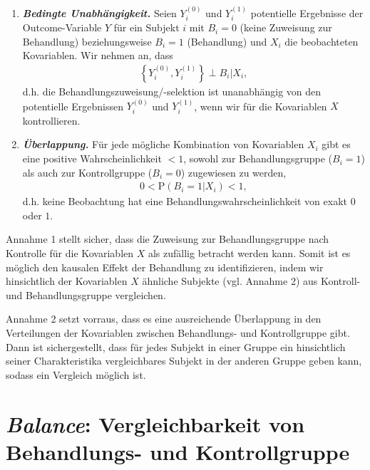 \documentclass[
  a4paper,
  DIV=11,
  oneside]{scrreprt}
\begin{document}
\begin{enumerate}
\def\labelenumi{\arabic{enumi}.}
\item
  \textbf{\emph{Bedingte Unabhängigkeit.}} Seien \(Y^{(0)}_i\) und
  \(Y^{(1)}_i\) potentielle Ergebnisse der Outcome-Variable \(Y\) für
  ein Subjekt \(i\) mit \(B_i=0\) (keine Zuweisung zur Behandlung)
  beziehungsweise \(B_i=1\) (Behandlung) und \(X_i\) die beobachteten
  Kovariablen. Wir nehmen an, dass \begin{align}
    \left\{Y^{(0)}_i, Y^{(1)}_i\right\} \perp B_i\vert X_i, \label{eq:cia}
  \end{align} d.h. die Behandlungszuweisung/-selektion ist unanabhängig
  von den potentielle Ergebnissen \(Y^{(0)}_i\) und \(Y^{(1)}_i\), wenn
  wir für die Kovariablen \(X\) kontrollieren.
\item
  \textbf{\emph{Überlappung.}} Für jede mögliche Kombination von
  Kovariablen \(X_i\) gibt es eine positive Wahrscheinlichkeit \(<1\),
  sowohl zur Behandlungsgruppe (\(B_i = 1\)) als auch zur Kontrollgruppe
  (\(B_i = 0\)) zugewiesen zu werden, \begin{align}
    0 < \text{P}(B_i=1\lvert X_i) < 1, \label{eq:overlap}
  \end{align} d.h. keine Beobachtung hat eine
  Behandlungswahrscheinlichkeit von exakt \(0\) oder \(1\).
\end{enumerate}

Annahme 1 stellt sicher, dass die Zuweisung zur Behandlungsgruppe nach
Kontrolle für die Kovariablen \(X\) als zufällig betracht werden kann.
Somit ist es möglich den kausalen Effekt der Behandlung zu
identifizieren, indem wir hinsichtlich der Kovariablen \(X\) ähnliche
Subjekte (vgl. Annahme 2) aus Kontroll- und Behandlungsgruppe
vergleichen.

Annahme 2 setzt vorraus, dass es eine ausreichende Überlappung in den
Verteilungen der Kovariablen zwischen Behandlungs- und Kontrollgruppe
gibt. Dann ist sichergestellt, dass für jedes Subjekt in einer Gruppe
ein hinsichtlich seiner Charakteristika vergleichbares Subjekt in der
anderen Gruppe geben kann, sodass ein Vergleich möglich ist.

\hypertarget{sec-balance}{%
\section{\texorpdfstring{\emph{Balance}: Vergleichbarkeit von
Behandlungs- und
Kontrollgruppe}{Balance: Vergleichbarkeit von Behandlungs- und Kontrollgruppe}}\label{sec-balance}}
\end{document}
